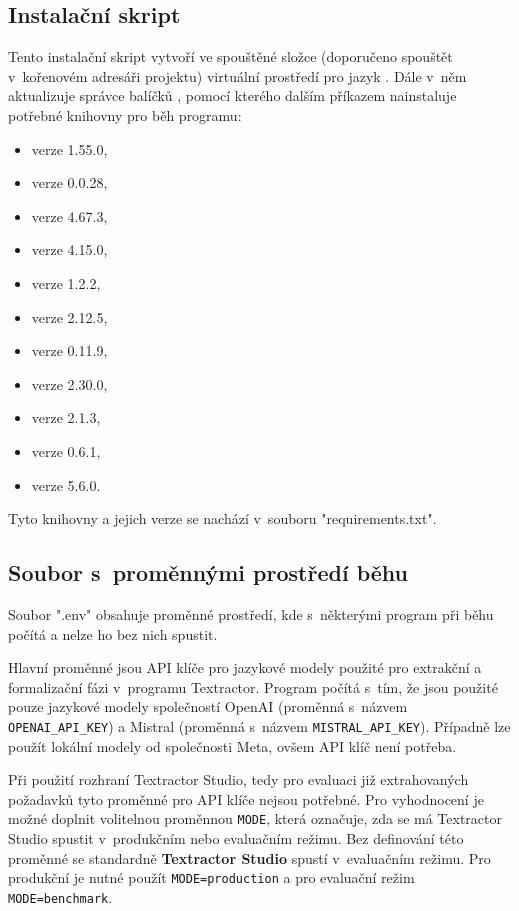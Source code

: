 \documentclass[czech, bc, kiv, he, iso690numb, pdf]{fasthesis}
\begin{document}
\subsection{Instalační skript}\label{sec:instalacni-skript}
Tento instalační skript vytvoří ve spouštěné složce (doporučeno spouštět v~kořenovém adresáři projektu) virtuální prostředí pro jazyk . Dále v~něm aktualizuje správce balíčků , pomocí kterého dalším příkazem nainstaluje potřebné knihovny pro běh programu:
\begin{itemize}
    \item {} verze 1.55.0,
    \item {} verze 0.0.28,
    \item {} verze 4.67.3,
    \item {} verze 4.15.0,
    \item {} verze 1.2.2,
    \item {} verze 2.12.5,
    \item {} verze 0.11.9,
    \item {} verze 2.30.0,
    \item {} verze 2.1.3,
    \item {} verze 0.6.1,
    \item {} verze 5.6.0.
\end{itemize}
Tyto knihovny a jejich verze se nachází v~souboru \filename"requirements.txt".

\subsection{Soubor s~proměnnými prostředí běhu}
Soubor \filename".env" obsahuje proměnné prostředí, kde s~některými program při běhu počítá a nelze ho bez nich spustit.

Hlavní proměnné jsou API klíče pro jazykové modely použité pro extrakční a formalizační fázi v~programu Textractor. Program počítá s~tím, že jsou použité pouze jazykové modely společností OpenAI (proměnná s~názvem \verb"OPENAI_API_KEY") a Mistral (proměnná s~názvem \verb"MISTRAL_API_KEY"). Případně lze použít lokální modely  od společnosti Meta, ovšem API klíč není potřeba.

Při použití rozhraní Textractor Studio, tedy pro evaluaci již extrahovaných požadavků tyto proměnné pro API klíče nejsou potřebné. Pro vyhodnocení je možné doplnit volitelnou proměnnou \verb"MODE", která označuje, zda se má Textractor Studio spustit v~produkčním nebo evaluačním režimu. Bez definování této proměnné se standardně \textbf{Textractor Studio} spustí v~evaluačním režimu. Pro produkční je nutné použít \verb"MODE=production" a pro evaluační režim \verb"MODE=benchmark".
\end{document}
